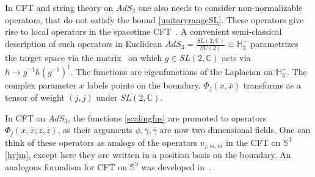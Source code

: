 \documentclass[12pt]{article}
\def\sltwoc{\ensuremath{SL(2,\bC)}}
\def\sutwo{{SU(2)}}
\newcommand{\bC}{{\mathbb C}}
\newcommand{\bH}{{\mathbb H}}
\newcommand{\bS}{{\mathbb S}}
\numberwithin{equation}{section}
\begin{document}
In CFT and string theory on $AdS_3$ one also needs to consider non-normalizable operators, that do not satisfy the bound \eqref{unitaryrangeSL}. These operators give rise to local operators in the spacetime CFT~.  A convenient semi-classical description of such operators in Euclidean $AdS_3=\frac{\sltwoc}{\sutwo}\equiv \bH_3^+$ parametrizes the target space via the matrix~
on which $g\in\sltwoc$ acts via $h\to g^{-1}h(g^{-1})^\dagger$.  The functions
are eigenfunctions of the Laplacian on $\bH_3^+$. The complex parameter $x$ labels points on the boundary. $\Phi_j(x,\bar x)$ transforms as a tensor of weight $(j,j)$ under $\sltwoc$.

In CFT on $AdS_3$, the functions \eqref{scalingfns} are promoted to operators $\Phi_j(x,\bar x;z,\bar z)$, as their arguments $\phi,\gamma,\bar\gamma$ are now two dimensional fields. One can think of these operators as analogs of the operators $v_{j;m,\bar m}$ in the CFT on $\bS^3$ \eqref{hvjm}, except here they are written in a position basis on the boundary. An analogous formalism for CFT on $\bS^3$ was developed in~.
\end{document}
